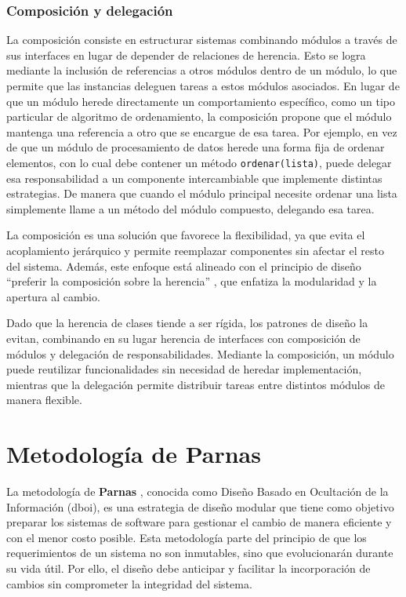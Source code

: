 \subsubsection*{Composición y delegación}
La composición consiste en estructurar sistemas combinando módulos a través de sus interfaces en lugar de depender de relaciones de herencia. Esto se logra mediante la inclusión de referencias a otros módulos dentro de un módulo, lo que permite que las instancias deleguen tareas a estos módulos asociados. En lugar de que un módulo herede directamente un comportamiento específico, como un tipo particular de algoritmo de ordenamiento, la composición propone que el módulo mantenga una referencia a otro que se encargue de esa tarea. Por ejemplo, en vez de que un módulo de procesamiento de datos herede una forma fija de ordenar elementos, con lo cual debe contener un método \verb|ordenar(lista)|, puede delegar esa responsabilidad a un componente intercambiable que implemente distintas estrategias. De manera que cuando el módulo principal necesite ordenar una lista simplemente llame a un método del módulo compuesto, delegando esa tarea.

 La composición es una solución que favorece la flexibilidad, ya que evita el acoplamiento jerárquico y permite reemplazar componentes sin afectar el resto del sistema. Además, este enfoque está alineado con el principio de diseño ``preferir la composición sobre la herencia'' \cite{Gamma:1995:DPE:186897}, que enfatiza la modularidad y la apertura al cambio.

Dado que la herencia de clases tiende a ser rígida, los patrones de diseño la evitan, combinando en su lugar herencia de interfaces con composición de módulos y delegación de responsabilidades. Mediante la composición, un módulo puede reutilizar funcionalidades sin necesidad de heredar implementación, mientras que la delegación permite distribuir tareas entre distintos módulos de manera flexible.


\section{Metodología de Parnas}
\label{metoParnas}

La metodología de \textbf{Parnas} \cite{Parnas1972}, conocida como Diseño Basado en Ocultación de la Información (\gls{dboi}), es una estrategia de diseño modular que tiene como objetivo preparar los sistemas de software para gestionar el cambio de manera eficiente y con el menor costo posible. Esta metodología parte del principio de que los requerimientos de un sistema no son inmutables, sino que evolucionarán durante su vida útil. Por ello, el diseño debe anticipar y facilitar la incorporación de cambios sin comprometer la integridad del sistema.

